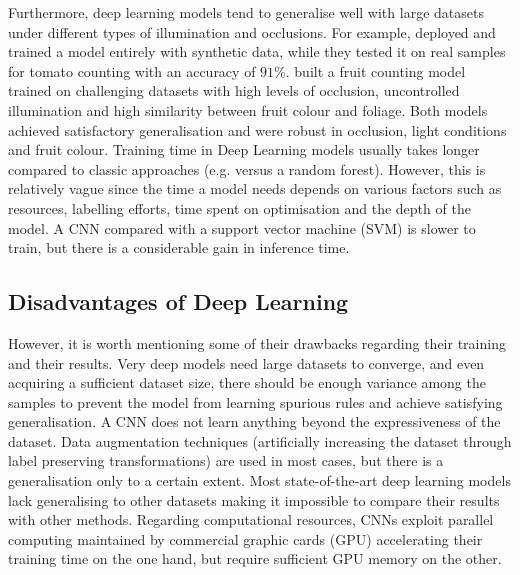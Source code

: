 Furthermore, deep learning models tend to generalise well with large datasets under different types of illumination and occlusions. For example, \cite{rahnemoonfar2017deep} deployed and trained a model entirely with synthetic data, while they tested it on real samples for tomato counting with an accuracy of $91\%$. \cite{chen2017counting} built a fruit counting model trained on challenging datasets with high levels of occlusion, uncontrolled illumination and high similarity between fruit colour and foliage. Both models achieved satisfactory generalisation and were robust in occlusion, light conditions and fruit colour. Training time in Deep Learning models usually takes longer compared to classic approaches (e.g. versus a random forest). However, this is relatively vague since the time a model needs depends on various factors such as resources,  labelling efforts, time spent on optimisation and the depth of the model. A CNN compared with a support vector machine (SVM) is slower to train, but there is a considerable gain in inference time.

\subsection{Disadvantages of Deep Learning}
However, it is worth mentioning some of their drawbacks regarding their training and their results. Very deep models need large datasets to converge, and even acquiring a sufficient dataset size, there should be enough variance among the samples to prevent the model from learning spurious rules and achieve satisfying generalisation. A CNN does not learn anything beyond the expressiveness of the dataset. Data augmentation techniques (artificially increasing the dataset through label preserving transformations) are used in most cases, but there is a generalisation only to a certain extent. Most state-of-the-art deep learning models lack generalising to other datasets making it impossible to compare their results with other methods. Regarding computational resources, CNNs exploit parallel computing maintained by commercial graphic cards (GPU) accelerating their training time on the one hand, but require sufficient GPU memory on the other.


